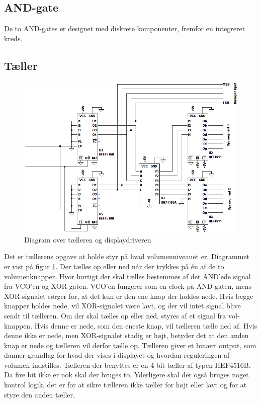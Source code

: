\subsection*{AND-gate}
\label{volumenkontrol-design-and}

De to AND-gates er designet med diskrete komponenter, fremfor en integreret kreds.

\subsection*{Tæller}
\label{volumenkontrol-design-taeller}

\begin{figure}[h]
\centering
\includegraphics[width=\textwidth]{teknisk/volumenkontrol/taeller.png}
\caption{Diagram over tælleren og displaydriveren}
\label{fig:taeller}
\end{figure}
Det er tællerens opgave at holde styr på hvad volumenniveauet er. Diagrammet er vist på figur \ref{fig:taeller}. Der tælles op eller ned når der trykkes på én af de to volumenknapper. Hvor hurtigt der skal tælles bestemmes af det AND'ede signal fra VCO'en og XOR-gaten. VCO'en fungerer som en clock på AND-gaten, mens XOR-signalet sørger for, at det kun er den ene knap der holdes nede. Hvis begge knapper holdes nede, vil XOR-signalet være lavt, og der vil intet signal blive sendt til tælleren. Om der skal tælles op eller ned, styres af et signal fra vol- knappen. Hvis denne er nede, som den eneste knap, vil tælleren tælle ned af. Hvis denne ikke er nede, men XOR-signalet stadig er højt, betyder det at den anden knap er nede og tælleren vil derfor tælle op. Tælleren giver et binært output, som danner grundlag for hvad der vises i displayet og hvordan reguleringen af volumen indstilles. Tælleren der benyttes er en 4-bit tæller af typen HEF4516B. Da fire bit ikke er nok skal der bruges to. Yderligere skal der også bruges noget kontrol logik, det er for at sikre tælleren ikke tæller for højt eller lavt og for at styre den anden tæller.

